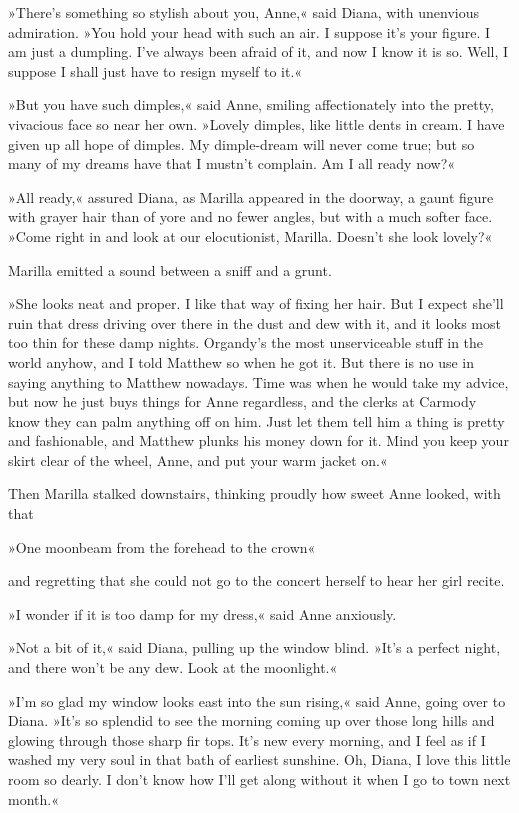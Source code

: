 »There's something so stylish about you, Anne,« said Diana, with unenvious admiration. »You hold your head with such an air. I suppose it's your figure. I am just a dumpling. I've always been afraid of it, and now I know it is so. Well, I suppose I shall just have to resign myself to it.«

»But you have such dimples,« said Anne, smiling affectionately into the pretty, vivacious face so near her own. »Lovely dimples, like little dents in cream. I have given up all hope of dimples. My dimple-dream will never come true; but so many of my dreams have that I mustn't complain. Am I all ready now?«

»All ready,« assured Diana, as Marilla appeared in the doorway, a gaunt figure with grayer hair than of yore and no fewer angles, but with a much softer face. »Come right in and look at our elocutionist, Marilla. Doesn't she look lovely?«

Marilla emitted a sound between a sniff and a grunt.

»She looks neat and proper. I like that way of fixing her hair. But I expect she'll ruin that dress driving over there in the dust and dew with it, and it looks most too thin for these damp nights. Organdy's the most unserviceable stuff in the world anyhow, and I told Matthew so when he got it. But there is no use in saying anything to Matthew nowadays. Time was when he would take my advice, but now he just buys things for Anne regardless, and the clerks at Carmody know they can palm anything off on him. Just let them tell him a thing is pretty and fashionable, and Matthew plunks his money down for it. Mind you keep your skirt clear of the wheel, Anne, and put your warm jacket on.«

Then Marilla stalked downstairs, thinking proudly how sweet Anne looked, with that

»One moonbeam from the forehead to the crown«

and regretting that she could not go to the concert herself to hear her girl recite.

»I wonder if it is too damp for my dress,« said Anne anxiously.

»Not a bit of it,« said Diana, pulling up the window blind. »It's a perfect night, and there won't be any dew. Look at the moonlight.«

»I'm so glad my window looks east into the sun rising,« said Anne, going over to Diana. »It's so splendid to see the morning coming up over those long hills and glowing through those sharp fir tops. It's new every morning, and I feel as if I washed my very soul in that bath of earliest sunshine. Oh, Diana, I love this little room so dearly. I don't know how I'll get along without it when I go to town next month.«

